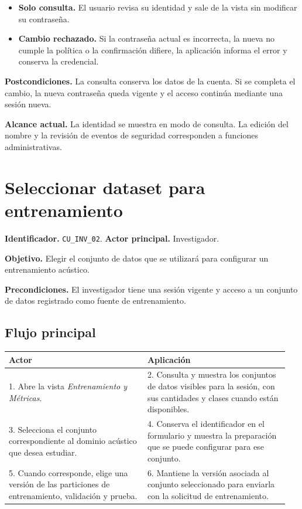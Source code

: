 \begin{itemize}
    \item \textbf{Solo consulta.} El usuario revisa su identidad y sale
    de la vista sin modificar su contraseña.
    \item \textbf{Cambio rechazado.} Si la contraseña actual es
    incorrecta, la nueva no cumple la política o la confirmación
    difiere, la aplicación informa el error y conserva la credencial.
\end{itemize}

\noindent\textbf{Postcondiciones.} La consulta conserva los datos de la
cuenta. Si se completa el cambio, la nueva contraseña queda vigente y
el acceso continúa mediante una sesión nueva.

\noindent\textbf{Alcance actual.} La identidad se muestra en modo de
consulta. La edición del nombre y la revisión de eventos de seguridad
corresponden a funciones administrativas.

\section{Seleccionar dataset para entrenamiento}
\label{cu:inv-02}

\noindent\textbf{Identificador.} \texttt{CU\_INV\_02}.
\textbf{Actor principal.} Investigador.

\noindent\textbf{Objetivo.} Elegir el conjunto de datos que se utilizará
para configurar un entrenamiento acústico.

\noindent\textbf{Precondiciones.} El investigador tiene una sesión
vigente y acceso a un conjunto de datos registrado como fuente de
entrenamiento.

\subsection*{Flujo principal}

\noindent
\begin{tabular}{@{}p{0.47\linewidth}p{0.48\linewidth}@{}}
    \hline
    \textbf{Actor} & \textbf{Aplicación} \\
    \hline
    1. Abre la vista \emph{Entrenamiento y Métricas}. &
    2. Consulta y muestra los conjuntos de datos visibles para la sesión, con sus cantidades y clases cuando están disponibles. \\
    3. Selecciona el conjunto correspondiente al dominio acústico que desea estudiar. &
    4. Conserva el identificador en el formulario y muestra la preparación que se puede configurar para ese conjunto. \\
    5. Cuando corresponde, elige una versión de las particiones de entrenamiento, validación y prueba. &
    6. Mantiene la versión asociada al conjunto seleccionado para enviarla con la solicitud de entrenamiento. \\
    \hline
\end{tabular}

